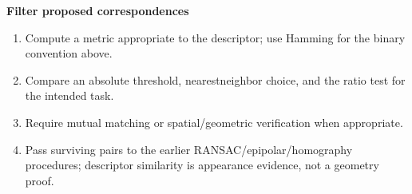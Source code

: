 \documentclass[letterpaper,11pt,english,openany,oneside]{jupyterBook}
\begin{document}
\begin{TextbookBox}
\textbf{Filter proposed correspondences}\par\smallskip
\begin{enumerate}
%
\item {}
\sphinxAtStartPar
Compute a metric appropriate to the descriptor; use Hamming for the binary convention above.

\item {}
\sphinxAtStartPar
Compare an absolute threshold, nearest\sphinxhyphen{}neighbor choice, and the ratio test for the intended task.

\item {}
\sphinxAtStartPar
Require mutual matching or spatial/geometric verification when appropriate.

\item {}
\sphinxAtStartPar
Pass surviving pairs to the earlier RANSAC/epipolar/homography procedures; descriptor similarity is appearance evidence, not a geometry proof.

\end{enumerate}

\end{TextbookBox}
\label{\detokenize{lectures/lecture05/descriptors:ex-lec05-bits}}
\end{document}
